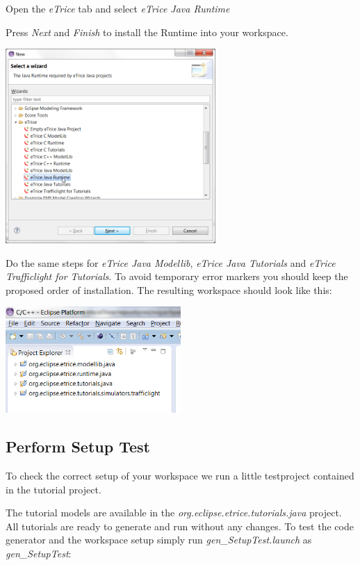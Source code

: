 Open the \emph{eTrice} tab and select \textit{eTrice Java Runtime}

Press \emph{Next} and \emph{Finish} to install the Runtime into your workspace.

\includegraphics[width=0.6\textwidth]{images/013-SetupWorkspace03.png}

\newpage
Do the same steps for \textit{eTrice Java Modellib}, \textit{eTrice Java Tutorials} and \textit{eTrice Trafficlight for Tutorials}. To avoid temporary 
error markers you should keep the proposed order of installation. The resulting workspace should look like 
this:

\includegraphics[width=0.5\textwidth]{images/013-SetupWorkspace04.png}

\subsection{Perform Setup Test}

To check the correct setup of your workspace we run a little testproject contained in the tutorial project.

The tutorial models are available in the \textit{org.eclipse.etrice.tutorials.java} project. All tutorials are 
ready to generate and run without any changes. To test the code generator and the workspace setup simply run 
\emph{gen\_SetupTest.launch} as \emph{gen\_SetupTest}: 

